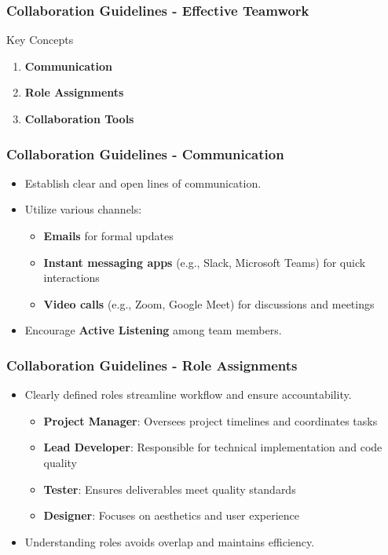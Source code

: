 \documentclass[aspectratio=169]{beamer}
\begin{document}
\begin{frame}[fragile]
    \frametitle{Collaboration Guidelines - Effective Teamwork}
    \begin{block}{Key Concepts}
        \begin{enumerate}
            \item \textbf{Communication}
            \item \textbf{Role Assignments}
            \item \textbf{Collaboration Tools}
        \end{enumerate}
    \end{block}
\end{frame}

\begin{frame}[fragile]
    \frametitle{Collaboration Guidelines - Communication}
    \begin{itemize}
        \item Establish clear and open lines of communication.
        \item Utilize various channels:
        \begin{itemize}
            \item \textbf{Emails} for formal updates
            \item \textbf{Instant messaging apps} (e.g., Slack, Microsoft Teams) for quick interactions
            \item \textbf{Video calls} (e.g., Zoom, Google Meet) for discussions and meetings
        \end{itemize}
        \item Encourage \textbf{Active Listening} among team members.
    \end{itemize}
\end{frame}

\begin{frame}[fragile]
    \frametitle{Collaboration Guidelines - Role Assignments}
    \begin{itemize}
        \item Clearly defined roles streamline workflow and ensure accountability.
        \begin{itemize}
            \item \textbf{Project Manager}: Oversees project timelines and coordinates tasks
            \item \textbf{Lead Developer}: Responsible for technical implementation and code quality
            \item \textbf{Tester}: Ensures deliverables meet quality standards
            \item \textbf{Designer}: Focuses on aesthetics and user experience
        \end{itemize}
        \item Understanding roles avoids overlap and maintains efficiency.
    \end{itemize}
\end{frame}
\end{document}
